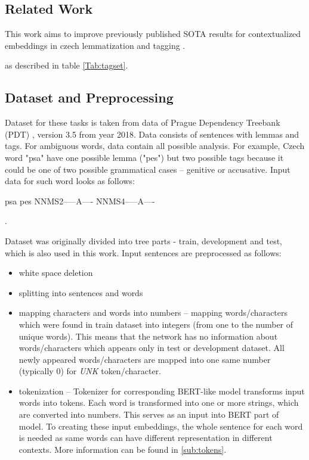 \subsection{Related Work}
This work aims to improve previously published SOTA results for contextualized embeddings in czech lemmatization and tagging \citep{Straka2019}. 

as described in table \ref{Tab:tagset}.  %



\subsection{Dataset and Preprocessing}
\label{sub:dataset}
Dataset for these tasks is taken from data of Prague Dependency Treebank (PDT) \citep{PDT35}, version 3.5 from year 2018. %
Data consists of sentences with lemmas and tags. For ambiguous words, data contain all possible analysis. For example, Czech word "psa" have one possible lemma ("pes") but two possible tags because it could be one of two possible grammatical cases -- genitive or accusative. Input data for such word looks as follows: \\
\begin{center}
psa pes NNMS2-----A---- NNMS4-----A----
\end{center}.

Dataset was originally divided into tree parts - train, development and test, which is also used in this work. Input sentences are preprocessed as follows: %
\begin{itemize}
\item white space deletion
\item splitting into sentences and words
\item mapping characters and words into numbers -- mapping  words/characters which were found in train dataset into integers (from one to the number of unique words). This means that the network has no information about words/characters which appears only in test or development dataset. All newly appeared words/characters are mapped into one same number (typically $0$) for \textit{UNK} token/character.
\item tokenization -- Tokenizer for corresponding BERT-like model transforms input words into tokens. Each word is transformed into one or more strings, which are converted into numbers. This serves as an input into BERT part of model. To creating these input embeddings, the whole sentence for each word is needed as same words can have different representation in different contexts. More information can be found in \ref{sub:tokens}.
\end{itemize}

